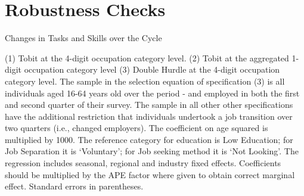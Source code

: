 \documentclass[12pt,authoryear]{elsarticle}
\begin{document}
		\section{Robustness Checks}
	\label{app:Robust}
		\newpage
	\thispagestyle{empty}
	\begin{table}[htbp]
		\centering
		\caption{Changes in Tasks and Skills over the Cycle}\label{tab:ProbitResults}
		\begin{adjustbox}{width=0.5\textwidth}
			\begin{threeparttable}
				
				
				\begin{tablenotes}
					\item{\footnotesize{(1) Tobit at the 4-digit occupation category level. (2) Tobit at the aggregated 1-digit occupation category level (3) Double Hurdle at the 4-digit occupation category level. The sample in the selection equation of specification (3) is all individuals aged 16-64 years old over the period \hspace{-1mm}-\hspace{-1mm} and employed in both the first and second quarter of their survey. The sample in all other other specifications have the additional restriction that individuals undertook a job transition over two quarters (i.e., changed employers). The coefficient on age squared is multiplied by 1000. The reference category for education is Low Education; for Job Separation it is `Voluntary';  for Job seeking method it is `Not Looking'. The regression includes seasonal, regional and industry fixed effects. Coefficients should be  multiplied by the APE factor where given to obtain correct marginal effect. Standard errors in parentheses.}}
				\end{tablenotes}
			\end{threeparttable}
		\end{adjustbox}
	\end{table}
	\restoregeometry %
	\newpage
	
\end{document}
